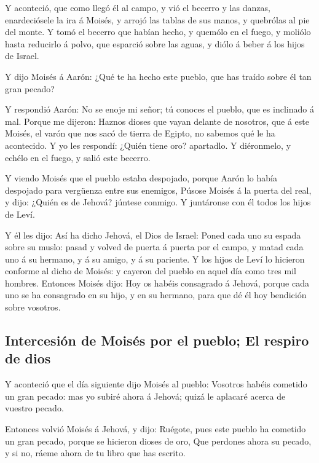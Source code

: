  Y aconteció, que como llegó él al campo, y vió el
becerro y las danzas, enardeciósele la ira á Moisés, y arrojó las tablas
de sus manos, y quebrólas al pie del monte.  Y tomó el
becerro que habían hecho, y quemólo en el fuego, y moliólo hasta
reducirlo á polvo, que esparció sobre las aguas, y diólo á beber á los
hijos de Israel.

 Y dijo Moisés á Aarón: ¿Qué te ha hecho este pueblo, que
has traído sobre él tan gran pecado?

 Y respondió Aarón: No se enoje mi señor; tú conoces el
pueblo, que es inclinado á mal.  Porque me dijeron:
Haznos dioses que vayan delante de nosotros, que á este Moisés, el varón
que nos sacó de tierra de Egipto, no sabemos qué le ha acontecido.
 Y yo les respondí: ¿Quién tiene oro? apartadlo. Y
diéronmelo, y echélo en el fuego, y salió este becerro.

 Y viendo Moisés que el pueblo estaba despojado, porque
Aarón lo había despojado para vergüenza entre sus enemigos,
 Púsose Moisés á la puerta del real, y dijo: ¿Quién es de
Jehová? júntese conmigo. Y juntáronse con él todos los hijos de Leví.

 Y él les dijo: Así ha dicho Jehová, el Dios de Israel:
Poned cada uno su espada sobre su muslo: pasad y volved de puerta á
puerta por el campo, y matad cada uno á su hermano, y á su amigo, y á su
pariente.  Y los hijos de Leví lo hicieron conforme al
dicho de Moisés: y cayeron del pueblo en aquel día como tres mil
hombres.  Entonces Moisés dijo: Hoy os habéis consagrado
á Jehová, porque cada uno se ha consagrado en su hijo, y en su hermano,
para que dé él hoy bendición sobre vosotros.

\hypertarget{intercesiuxf3n-de-moisuxe9s-por-el-pueblo-el-respiro-de-dios}{%
\subsection{Intercesión de Moisés por el pueblo; El respiro de
dios}\label{intercesiuxf3n-de-moisuxe9s-por-el-pueblo-el-respiro-de-dios}}

 Y aconteció que el día siguiente dijo Moisés al pueblo:
Vosotros habéis cometido un gran pecado: mas yo subiré ahora á Jehová;
quizá le aplacaré acerca de vuestro pecado.

 Entonces volvió Moisés á Jehová, y dijo: Ruégote, pues
este pueblo ha cometido un gran pecado, porque se hicieron dioses de
oro,  Que perdones ahora su pecado, y si no, ráeme ahora
de tu libro que has escrito.

